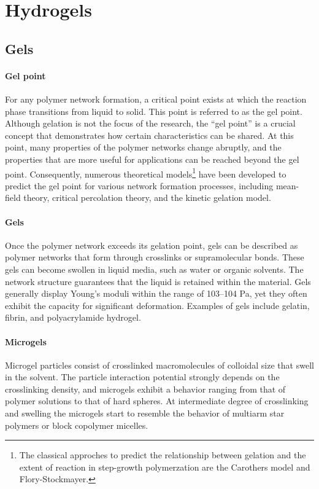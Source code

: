 \section{Hydrogels}

\subsection{Gels}

\paragraph{Gel point} For any polymer network formation, a critical point exists at which the reaction phase transitions from liquid to solid. 
This point is referred to as the gel point.
Although gelation is not the focus of the research, the ``gel point'' is a crucial concept that demonstrates how certain characteristics can be shared.
At this point, many properties of the polymer networks change abruptly, and the properties that are more useful for applications can be reached beyond the gel point.
Consequently, numerous theoretical models\footnote{The classical approches to predict the relationship between gelation and the extent of reaction in step-growth polymerzation are the Carothers model and Flory-Stockmayer\citep{guPolymerNetworksPlastics2020}.} have been developed to predict the gel point for various network formation processes, including mean-field theory, critical percolation theory, and the kinetic gelation model\citep{guPolymerNetworksPlastics2020}.

\paragraph{Gels} Once the polymer network exceeds its gelation point, gels can be described as polymer networks that form through crosslinks or supramolecular bonds. 
These gels can become swollen in liquid media, such as water or organic solvents.
The network structure guarantees that the liquid is retained within the material.
Gels generally display Young's moduli within the range of 103–104 Pa, yet they often exhibit the capacity for significant deformation.
Examples of gels include gelatin, fibrin, and polyacrylamide hydrogel\citep{guPolymerNetworksPlastics2020}.


\paragraph{Microgels}  
Microgel particles consist of crosslinked macromolecules of colloidal size that swell in the solvent. 
The particle interaction potential strongly depends on the crosslinking density, and microgels exhibit a behavior ranging from that of polymer solutions to that of hard spheres. 
At intermediate degree of crosslinking and swelling the microgels start to resemble the behavior of multiarm star polymers or block copolymer micelles\citep{senffTemperatureSensitiveMicrogel1999}.


